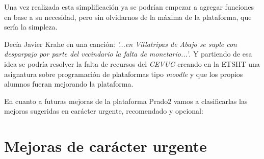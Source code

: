 \bigskip
Una vez realizada esta simplificación ya se podrían empezar a agregar funciones en base a su necesidad, pero sin olvidarnos de la máxima de la plataforma, que sería la simpleza.

\bigskip
Decía Javier Krahe en una canción: \textit{'...en Villatripas de Abajo se suple con desparpajo por parte del vecindario la falta de monetario...'}. Y partiendo de esa idea se podría resolver la falta de recursos del \textit{CEVUG} creando en la ETSIIT una asignatura sobre programación de plataformas tipo \textit{moodle} y que los propios alumnos fueran mejorando la plataforma.

\newpage
En cuanto a futuras mejoras de la plataforma Prado2 vamos a clasificarlas las mejoras sugeridas en carácter urgente, recomendado y opcional:

\section{Mejoras de carácter urgente}

